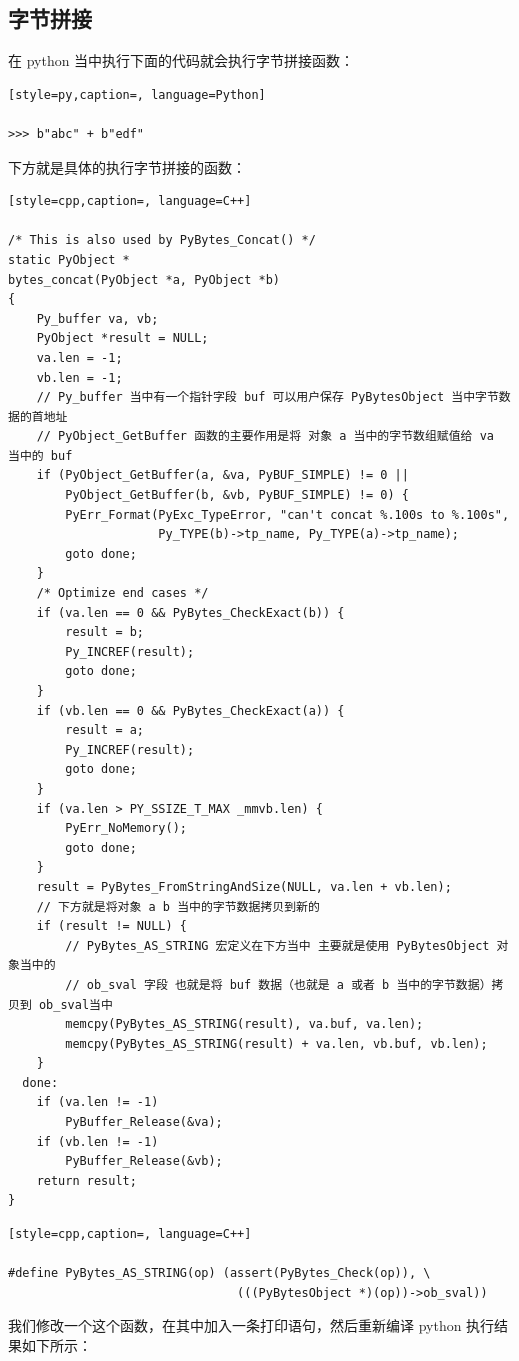 \subsection{字节拼接}
在 python 当中执行下面的代码就会执行字节拼接函数：
\begin{lstlisting}[style=py,caption=, language=Python]

>>> b"abc" + b"edf"
\end{lstlisting}
下方就是具体的执行字节拼接的函数：
\begin{lstlisting}[style=cpp,caption=, language=C++]

/* This is also used by PyBytes_Concat() */
static PyObject *
bytes_concat(PyObject *a, PyObject *b)
{
    Py_buffer va, vb;
    PyObject *result = NULL;
    va.len = -1;
    vb.len = -1;
    // Py_buffer 当中有一个指针字段 buf 可以用户保存 PyBytesObject 当中字节数据的首地址
    // PyObject_GetBuffer 函数的主要作用是将 对象 a 当中的字节数组赋值给 va 当中的 buf
    if (PyObject_GetBuffer(a, &va, PyBUF_SIMPLE) != 0 ||
        PyObject_GetBuffer(b, &vb, PyBUF_SIMPLE) != 0) {
        PyErr_Format(PyExc_TypeError, "can't concat %.100s to %.100s",
                     Py_TYPE(b)->tp_name, Py_TYPE(a)->tp_name);
        goto done;
    }
    /* Optimize end cases */
    if (va.len == 0 && PyBytes_CheckExact(b)) {
        result = b;
        Py_INCREF(result);
        goto done;
    }
    if (vb.len == 0 && PyBytes_CheckExact(a)) {
        result = a;
        Py_INCREF(result);
        goto done;
    }
    if (va.len > PY_SSIZE_T_MAX _mmvb.len) { 
        PyErr_NoMemory();
        goto done;
    }
    result = PyBytes_FromStringAndSize(NULL, va.len + vb.len);
    // 下方就是将对象 a b 当中的字节数据拷贝到新的
    if (result != NULL) {
        // PyBytes_AS_STRING 宏定义在下方当中 主要就是使用 PyBytesObject 对象当中的
        // ob_sval 字段 也就是将 buf 数据（也就是 a 或者 b 当中的字节数据）拷贝到 ob_sval当中
        memcpy(PyBytes_AS_STRING(result), va.buf, va.len);
        memcpy(PyBytes_AS_STRING(result) + va.len, vb.buf, vb.len);
    }
  done:
    if (va.len != -1)
        PyBuffer_Release(&va);
    if (vb.len != -1)
        PyBuffer_Release(&vb);
    return result;
}
\end{lstlisting}
\begin{lstlisting}[style=cpp,caption=, language=C++]

#define PyBytes_AS_STRING(op) (assert(PyBytes_Check(op)), \
                                (((PyBytesObject *)(op))->ob_sval))
\end{lstlisting}
我们修改一个这个函数，在其中加入一条打印语句，然后重新编译 python 执行结果如下所示：

